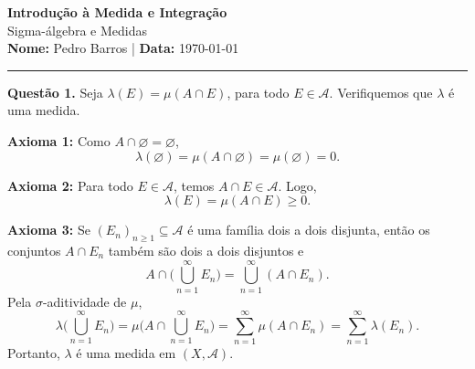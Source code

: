 \documentclass[12pt, a4paper]{article}
\newenvironment{solution}[1]{\par\vspace{1.2em}\noindent\textbf{Questão #1.}}{\par\vspace{0.5em}}
\begin{document}
\thispagestyle{empty} %
\begin{center}
    {\Large \textbf{Introdução à Medida e Integração}} \\[0.4em]
    {\large Sigma-álgebra e Medidas} \\[0.4em]
    \textbf{Nome:} Pedro Barros \quad | \quad \textbf{Data:} \today
\end{center}

\hrule
\vspace{1.5em}

\begin{solution}{1}
    Seja $\lambda(E)=\mu(A\cap E)$, para todo $E\in\mathcal{A}$. Verifiquemos que $\lambda$ é uma medida.

    \textbf{Axioma 1:} Como $A\cap\varnothing=\varnothing$,
    \[
        \lambda(\varnothing)=\mu(A\cap\varnothing)=\mu(\varnothing)=0.
    \]

    \textbf{Axioma 2:} Para todo $E\in\mathcal{A}$, temos $A\cap E\in\mathcal{A}$. Logo,
    \[
        \lambda(E)=\mu(A\cap E)\geq 0.
    \]

    \textbf{Axioma 3:} Se $(E_n)_{n\geq1}\subseteq\mathcal{A}$ é uma família dois a dois disjunta, então os conjuntos $A\cap E_n$ também são dois a dois disjuntos e
    \[
        A\cap\biggl(\bigcup_{n=1}^{\infty}E_n\biggr)
        =\bigcup_{n=1}^{\infty}(A\cap E_n).
    \]
    Pela $\sigma$-aditividade de $\mu$,
    \[
        \lambda\biggl(\bigcup_{n=1}^{\infty}E_n\biggr)
        =\mu\biggl(A\cap\bigcup_{n=1}^{\infty}E_n\biggr)
        =\sum_{n=1}^{\infty}\mu(A\cap E_n)
        =\sum_{n=1}^{\infty}\lambda(E_n).
    \]
    Portanto, $\lambda$ é uma medida em $(X,\mathcal{A})$.
\end{solution}
\end{document}
